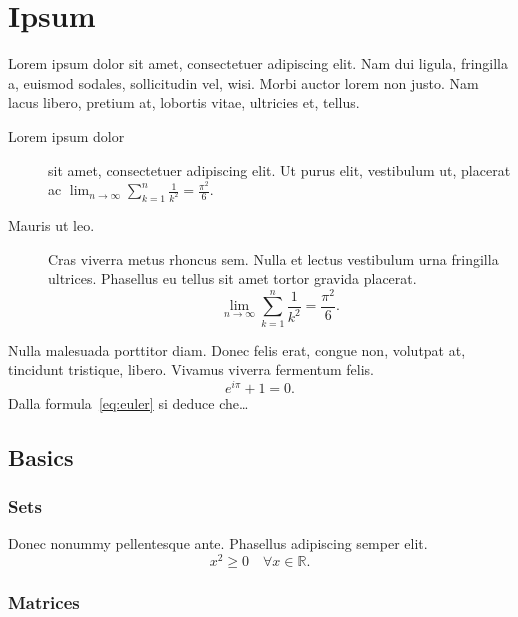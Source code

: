 
\chapter{Ipsum}
\label{cap:appendix-2}

Lorem ipsum dolor sit amet, consectetuer adipiscing elit. Nam dui ligula, fringilla a, euismod sodales, sollicitudin vel, wisi. Morbi auctor lorem non justo. Nam lacus libero, pretium at, lobortis vitae, ultricies et, tellus.
\begin{description}
\item[Lorem ipsum dolor] sit amet, consectetuer adipiscing elit. Ut purus elit, vestibulum ut, placerat ac $\lim_{n \to \infty}\sum_{k=1}^n \frac{1}{k^2}= \frac{\pi^2}{6}$.
\item[Mauris ut leo.]
Cras viverra metus rhoncus sem. Nulla et lectus vestibulum urna fringilla ultrices. Phasellus eu tellus sit amet tortor gravida placerat.
\[
\lim_{n \to \infty}\sum_{k=1}^n \frac{1}{k^2}= \frac{\pi^2}{6}.
\]
\end{description}

Nulla malesuada porttitor diam. Donec felis erat, congue non, volutpat at, tincidunt tristique, libero. Vivamus viverra fermentum felis.
\begin{equation}
\label{eq:euler}
e^{i\pi}+1=0.
\end{equation}
Dalla formula~\eqref{eq:euler} 
si deduce che\dots

\section{Basics}

\subsection{Sets}

Donec nonummy pellentesque ante. Phasellus adipiscing semper elit.
\begin{equation}
x^2 \geq 0 \quad
\forall x \in \mathbb{R}.
\end{equation}

\subsection{Matrices}

